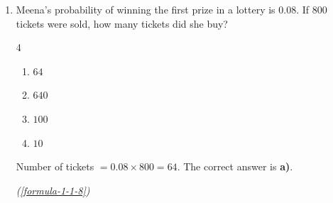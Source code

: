 \vspace{1.2em}
\begin{enumerate}[label={},font=\normalfont,leftmargin=1.15cm,labelwidth=1.0cm,labelsep=0.15cm,itemindent=0pt,listparindent=0pt,parsep=0pt,topsep=0pt]
\item[5.1.16] Meena's probability of winning the first prize in a lottery is $0.08$. If 800 tickets were sold, how many tickets did she buy?

\begin{multicols}{4}
\begin{enumerate}
\setlength{\itemsep}{0pt}
    \item $64$
    \item $640$
    \item $100$
    \item $10$
\end{enumerate}
\end{multicols}

\vspace{0.7em}\par\solution
 Number of tickets $=0.08\times800=64$. The correct answer is \textbf{a)}.
\par\noindent\hfill\mbox{\textit{(\ref{formula-1-1-8})}}\par\end{enumerate}
\vspace{1.2em}
